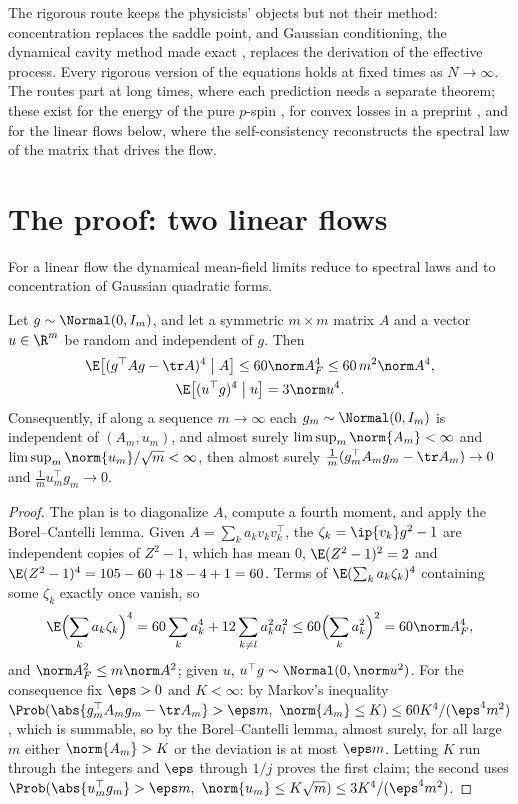 \begin{refsection}
The rigorous route keeps the physicists' objects but not their method: concentration replaces the saddle point, and Gaussian conditioning, the dynamical cavity method made exact \parencite{GerbelotEtAl2024}, replaces the derivation of the effective process. Every rigorous version of the equations holds at fixed times as $N\to\infty$. The routes part at long times, where each prediction needs a separate theorem; these exist for the energy of the pure $p$-spin \parencite{Sellke2024}, for convex losses in a preprint \parencite{CelentanoChengMontanari2021}, and for the linear flows below, where the self-consistency reconstructs the spectral law of the matrix that drives the flow.

\section{The proof: two linear flows}\label{sec:dmft:proof}

For a linear flow the dynamical mean-field limits reduce to spectral laws and to concentration of Gaussian quadratic forms.

\begin{lemma}\label{lem:dmft:quadratic}
Let $g\sim\Normal(0,I_m)$, and let a symmetric $m\times m$ matrix $A$ and a vector $u\in\R^m$ be random and independent of $g$. Then
\begin{gather*}
\E\bigl[(g^\top Ag-\tr A)^4\bigm|A\bigr]\le60\norm A_F^4\le60\,m^2\norm A^4,\\
\E\bigl[(u^\top g)^4\bigm|u\bigr]=3\norm u^4.
\end{gather*}
Consequently, if along a sequence $m\to\infty$ each $g_m\sim\Normal(0,I_m)$ is independent of $(A_m,u_m)$, and almost surely $\limsup_m\norm{A_m}<\infty$ and $\limsup_m\norm{u_m}/\sqrt m<\infty$, then almost surely $\frac1m(g_m^\top A_mg_m-\tr A_m)\to0$ and $\frac1mu_m^\top g_m\to0$.
\end{lemma}

\begin{proof}
The plan is to diagonalize $A$, compute a fourth moment, and apply the Borel--Cantelli lemma. Given $A=\sum_ka_kv_kv_k^\top$, the $\zeta_k=\ip{v_k}g^2-1$ are independent copies of $Z^2-1$, which has mean $0$, $\E(Z^2-1)^2=2$ and $\E(Z^2-1)^4=105-60+18-4+1=60$. Terms of $\E(\sum_ka_k\zeta_k)^4$ containing some $\zeta_k$ exactly once vanish, so
\[
\E\Bigl(\sum_ka_k\zeta_k\Bigr)^4=60\sum_ka_k^4+12\sum_{k\ne l}a_k^2a_l^2\le60\Bigl(\sum_ka_k^2\Bigr)^2=60\norm A_F^4,
\]
and $\norm A_F^2\le m\norm A^2$; given $u$, $u^\top g\sim\Normal(0,\norm u^2)$. For the consequence fix $\eps>0$ and $K<\infty$: by Markov's inequality $\Prob(\abs{g_m^\top A_mg_m-\tr A_m}>\eps m,\ \norm{A_m}\le K)\le60K^4/(\eps^4m^2)$, which is summable, so by the Borel--Cantelli lemma, almost surely, for all large $m$ either $\norm{A_m}>K$ or the deviation is at most $\eps m$. Letting $K$ run through the integers and $\eps$ through $1/j$ proves the first claim; the second uses $\Prob(\abs{u_m^\top g_m}>\eps m,\ \norm{u_m}\le K\sqrt m)\le3K^4/(\eps^4m^2)$.
\end{proof}


\end{refsection}
